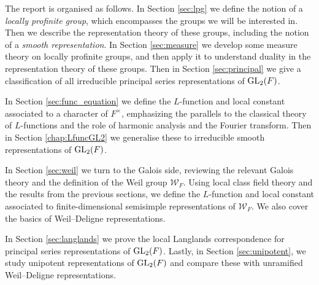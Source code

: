 The report is organised as follows. In Section \ref{sec:lpg} we define the notion of a \emph{locally profinite group}, which encompasses the groups we will be interested in. Then we describe the representation theory of these groups, including the notion of a \emph{smooth representation}. In Section \ref{sec:measure} we develop some measure theory on locally profinite groups, and then apply it to understand duality in the representation theory of these groups. Then in Section \ref{sec:principal} we give a classification of all irreducible principal series representations of $\mathrm{GL}_2(F)$.

In Section \ref{sec:func_equation} we define the $L$-function and local constant associated to a character of $F^\times$, emphasizing the parallels to the classical theory of $L$-functions and the role of harmonic analysis and the Fourier transform. Then in Section \ref{chap:LfuncGL2} we generalise these to irreducible smooth representations of $\mathrm{GL}_2(F)$.

In Section \ref{sec:weil} we turn to the Galois side, reviewing the relevant Galois theory and the definition of the Weil group $\mathcal W_F$. Using local class field theory and the results from the previous sections, we define the $L$-function and local constant associated to finite-dimensional semisimple representations of $\mathcal{W}_F$. We also cover the basics of Weil--Deligne representations.

In Section \ref{sec:langlands} we prove the local Langlands correspondence for principal series representations of $\mathrm{GL}_2(F)$. Lastly, in Section \ref{sec:unipotent}, we study unipotent representations of $\mathrm{GL}_2(F)$ and compare these with unramified Weil--Deligne representations. 


\newpage